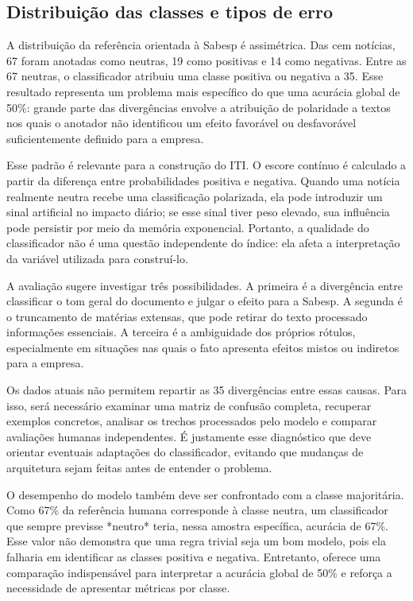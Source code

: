 \subsection{Distribuição das classes e tipos de erro}

A distribuição da referência orientada à Sabesp é assimétrica. Das cem notícias, 67 foram anotadas como neutras, 19 como positivas e 14 como negativas. Entre as 67 neutras, o classificador atribuiu uma classe positiva ou negativa a 35. Esse resultado representa um problema mais específico do que uma acurácia global de 50\%: grande parte das divergências envolve a atribuição de polaridade a textos nos quais o anotador não identificou um efeito favorável ou desfavorável suficientemente definido para a empresa.

Esse padrão é relevante para a construção do ITI. O escore contínuo é calculado a partir da diferença entre probabilidades positiva e negativa. Quando uma notícia realmente neutra recebe uma classificação polarizada, ela pode introduzir um sinal artificial no impacto diário; se esse sinal tiver peso elevado, sua influência pode persistir por meio da memória exponencial. Portanto, a qualidade do classificador não é uma questão independente do índice: ela afeta a interpretação da variável utilizada para construí-lo.

A avaliação sugere investigar três possibilidades. A primeira é a divergência entre classificar o tom geral do documento e julgar o efeito para a Sabesp. A segunda é o truncamento de matérias extensas, que pode retirar do texto processado informações essenciais. A terceira é a ambiguidade dos próprios rótulos, especialmente em situações nas quais o fato apresenta efeitos mistos ou indiretos para a empresa.

Os dados atuais não permitem repartir as 35 divergências entre essas causas. Para isso, será necessário examinar uma matriz de confusão completa, recuperar exemplos concretos, analisar os trechos processados pelo modelo e comparar avaliações humanas independentes. É justamente esse diagnóstico que deve orientar eventuais adaptações do classificador, evitando que mudanças de arquitetura sejam feitas antes de entender o problema.

O desempenho do modelo também deve ser confrontado com a classe majoritária. Como 67\% da referência humana corresponde à classe neutra, um classificador que sempre previsse *neutro* teria, nessa amostra específica, acurácia de 67\%. Esse valor não demonstra que uma regra trivial seja um bom modelo, pois ela falharia em identificar as classes positiva e negativa. Entretanto, oferece uma comparação indispensável para interpretar a acurácia global de 50\% e reforça a necessidade de apresentar métricas por classe.

